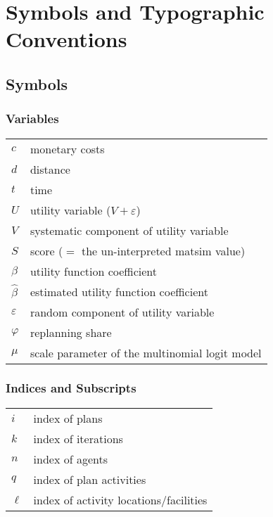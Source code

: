 \chapter*{Symbols and Typographic Conventions}
\label{ch:conventionsSymbols}
\section*{Symbols}
\label{sec:symbols}

\subsection*{Variables}
\begin{tabular}{l l}
	$c$ & monetary costs \\
  $d$ & distance \\
  $t$ & time \\
  $U$ & utility variable ($V + \varepsilon$) \\
  $V$ & systematic component of utility variable \\
  $S$ & score ($=$ the un-interpreted \acrshort{matsim} value)\\
  $\beta$ & utility function coefficient \\
  $\hat{\beta}$ & estimated utility function coefficient \\
  $\varepsilon$ & random component of utility variable \\ %
  $\varphi$ & replanning share \\
  $\mu$ & scale parameter of the multinomial logit model \\  
\end{tabular}

\subsection*{Indices and Subscripts}
\begin{tabular}{l l}
  $i$ & index of plans \\
  $k$ & index of iterations \\
  $n$ & index of agents \\
  $q$ & index of plan activities\\
  $\ell$ & index of activity locations/facilities \\
\end{tabular}

